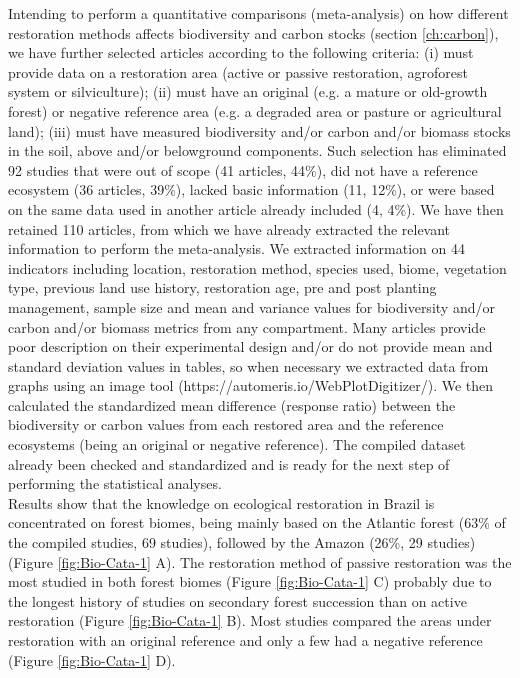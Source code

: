 \indent Intending to perform a quantitative comparisons (meta-analysis) on how different restoration methods affects biodiversity and carbon stocks (section \ref{ch:carbon}), we have further selected articles according to the following criteria: (i) must provide data on a restoration area (active or passive restoration, agroforest system or silviculture); (ii) must have an original (e.g. a mature or old-growth forest) or negative reference area (e.g. a degraded area or pasture or agricultural land); (iii) must have measured biodiversity and/or carbon and/or biomass stocks in the soil, above and/or belowground components. Such selection has eliminated 92 studies that were out of scope (41 articles, 44\%), did not have a reference ecosystem (36 articles, 39\%), lacked basic information (11, 12\%), or were based on the same data used in another article already included (4, 4\%). We have then retained 110 articles, from which we have already extracted the relevant information to perform the meta-analysis. We extracted information on 44 indicators including location, restoration method, species used, biome, vegetation type, previous land use history, restoration age, pre and post planting management, sample size and mean and variance values for biodiversity and/or carbon and/or biomass metrics from any compartment. Many articles provide poor description on their experimental design and/or do not provide mean and standard deviation values in tables, so when necessary we extracted data from graphs using an image tool (https://automeris.io/WebPlotDigitizer/). We then calculated the standardized mean difference (response ratio) between the biodiversity or carbon values from each restored area and the reference ecosystems (being an original or negative reference). The compiled dataset already been checked and standardized and is ready for the next step of performing the statistical analyses. \\
\indent Results show that the knowledge on ecological restoration in Brazil is concentrated on forest biomes, being mainly based on the Atlantic forest (63\% of the compiled studies, 69 studies), followed by the Amazon (26\%, 29 studies) (Figure \ref{fig:Bio-Cata-1} A). The restoration method of passive restoration was the most studied in both forest biomes (Figure \ref{fig:Bio-Cata-1} C) probably due to the longest history of studies on secondary forest succession than on active restoration (Figure \ref{fig:Bio-Cata-1} B). Most studies compared the areas under restoration with an original reference and only a few had a negative reference (Figure \ref{fig:Bio-Cata-1} D).  
